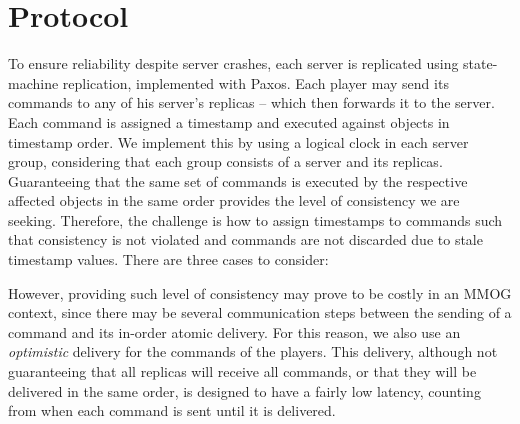 \documentclass[times, 10pt]{article}
\begin{document}
% 
%
%



\section{Protocol}

To ensure reliability despite server crashes, each server is replicated using state-machine replication, implemented with Paxos. Each player may send its commands to any of his server's replicas -- which then forwards it to the server. Each command is assigned a timestamp and executed against objects in timestamp order. We implement this by using a logical clock in each server group, considering that each group consists of a server and its replicas. Guaranteeing that the same set of commands is executed by the respective affected objects in the same order provides the level of consistency we are seeking. Therefore, the challenge is how to assign timestamps to commands such that consistency is not violated and commands are not discarded due to stale timestamp values. There are three cases to consider:

However, providing such level of consistency may prove to be costly in an MMOG context, since there may be several communication steps between the sending of a command and its in-order atomic delivery. For this reason, we also use an \emph{optimistic} delivery for the commands of the players. This delivery, although not guaranteeing that all replicas will receive all commands, or that they will be delivered in the same order, is designed to have a fairly low latency, counting from when each command is sent until it is delivered.
\end{document}

